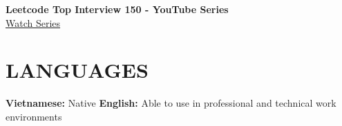 \documentclass[10pt,a4paper]{article}
\begin{document}
\vspace{8pt}

\begin{minipage}[t]{0.5\textwidth}
    \textbf{\small Leetcode Top Interview 150 - YouTube Series} \hfill \textcolor{darkgray}\\
    \href{https://www.youtube.com/playlist?list=PLE9QkkVvuT1kc_pgqSPTvgggPg37ZHA6V}{\textcolor{secondary}{\scriptsize Watch Series}}
\end{minipage}%

\vspace{6pt}

\section{LANGUAGES}
\textbf{\color{darkgray}\small Vietnamese:} \textcolor{text}{\small Native} \hspace{15pt} \textbf{\color{darkgray}\small English:} \textcolor{text}{\small  Able to use in professional and technical work environments }
\end{document}
